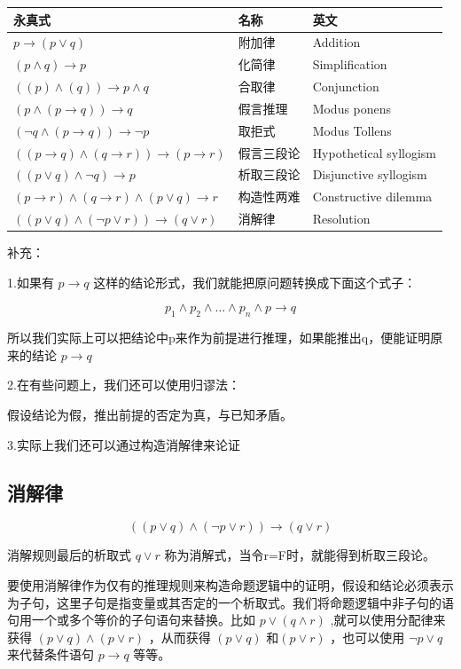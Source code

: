 \documentclass[12pt,a4paper,oneside]{ctexart}
\begin{document}
\begin{tabular}{@{}lll@{}}
\hline
永真式 & 名称 & 英文 \\
\hline
\(p\rightarrow (p\vee q)\) & 附加律 & Addition \\
\((p\wedge q)\rightarrow p\) & 化简律 & Simplification \\
\(((p)\wedge(q))\rightarrow p\wedge q\) & 合取律 & Conjunction \\
\((p\wedge(p\rightarrow q))\rightarrow q\) & 假言推理 & Modus ponens \\
\((\neg q\wedge(p\rightarrow q))\rightarrow\neg p\) & 取拒式 & Modus Tollens \\
\(((p\rightarrow q)\wedge(q\rightarrow r))\rightarrow(p\rightarrow r)\) & 假言三段论 & Hypothetical syllogism \\
\(((p\vee q)\wedge\neg q)\rightarrow p\) & 析取三段论 & Disjunctive syllogism \\
\((p\rightarrow r)\wedge(q\rightarrow r)\wedge(p\vee q)\rightarrow r\) & 构造性两难 & Constructive dilemma \\
\(((p\vee q)\wedge(\neg p\vee r))\rightarrow(q\vee r)\) & 消解律 & Resolution \\
\hline
\end{tabular}

补充：

1.如果有 \(p\rightarrow q\) 这样的结论形式，我们就能把原问题转换成下面这个式子：

\[p_1\wedge p_2\wedge...\wedge p_n\wedge p\rightarrow q\]

所以我们实际上可以把结论中p来作为前提进行推理，如果能推出q，便能证明原来的结论 \(p\rightarrow q\)

2.在有些问题上，我们还可以使用归谬法：

假设结论为假，推出前提的否定为真，与已知矛盾。

3.实际上我们还可以通过构造消解律来论证

\subsection*{消解律}

\[((p\vee q)\wedge(\neg p\vee r))\rightarrow (q\vee r)\]

消解规则最后的析取式 \(q\vee r\) 称为消解式，当令r=F时，就能得到析取三段论。

要使用消解律作为仅有的推理规则来构造命题逻辑中的证明，假设和结论必须表示为子句，这里子句是指变量或其否定的一个析取式。我们将命题逻辑中非子句的语句用一个或多个等价的子句语句来替换。比如 \(p\vee (q\wedge r)\) ,就可以使用分配律来获得 \((p\vee q)\wedge (p\vee r)\) ，从而获得 \((p\vee q)\) 和\((p\vee r)\) ，也可以使用 \(\neg p\vee q\) 来代替条件语句 \(p\rightarrow q\) 等等。
\end{document}
